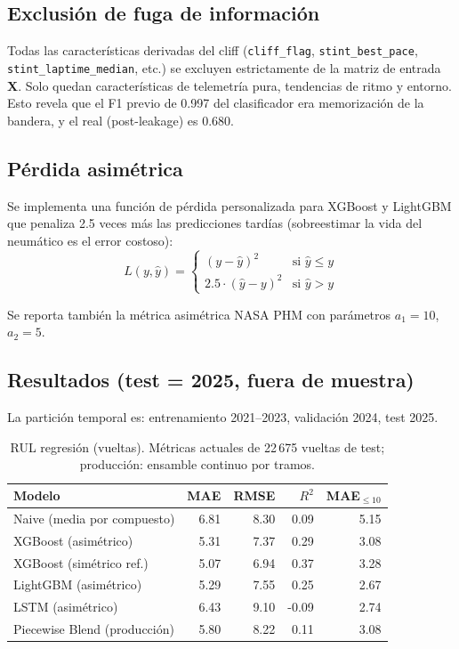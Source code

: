 \documentclass[conference]{IEEEtran}
\begin{document}
\subsection{Exclusión de fuga de información}

Todas las características derivadas del cliff (\texttt{cliff\_flag},
\texttt{stint\_best\_pace}, \texttt{stint\_laptime\_median}, etc.) se
excluyen estrictamente de la matriz de entrada \textbf{X}. Solo quedan
características de telemetría pura, tendencias de ritmo y entorno. Esto
revela que el F1 previo de 0.997 del clasificador era memorización de la
bandera, y el real (post-leakage) es 0.680.

\subsection{Pérdida asimétrica}

Se implementa una función de pérdida personalizada para XGBoost y LightGBM
que penaliza 2.5 veces más las predicciones tardías (sobreestimar la vida
del neumático es el error costoso):
\begin{equation}
  L(y, \hat{y}) = \begin{cases}
    (y - \hat{y})^2 & \text{si } \hat{y} \le y \\
    2.5 \cdot (\hat{y} - y)^2 & \text{si } \hat{y} > y
  \end{cases}
\end{equation}

Se reporta también la métrica asimétrica NASA PHM con parámetros
$a_1 = 10$, $a_2 = 5$.

\subsection{Resultados (test = 2025, fuera de muestra)}

La partición temporal es: entrenamiento 2021–2023, validación 2024,
test 2025.

\begin{table}[!htbp]
\centering
\caption{RUL regresión (vueltas). Métricas actuales de 22\,675 vueltas de test; producción: ensamble continuo por tramos.}
\label{tab:rul}
\begin{tabular}{lrrrr}
\toprule
\textbf{Modelo} & \textbf{MAE} & \textbf{RMSE} & $R^2$ & \textbf{MAE$_{\le 10}$} \\
\midrule
Naive (media por compuesto) & 6.81 & 8.30 & 0.09 & 5.15 \\
XGBoost (asimétrico) & 5.31 & 7.37 & 0.29 & 3.08 \\
XGBoost (simétrico ref.) & 5.07 & 6.94 & 0.37 & 3.28 \\
LightGBM (asimétrico) & 5.29 & 7.55 & 0.25 & 2.67 \\
LSTM (asimétrico) & 6.43 & 9.10 & -0.09 & 2.74 \\
Piecewise Blend (producción) & 5.80 & 8.22 & 0.11 & 3.08 \\
\bottomrule
\end{tabular}
\end{table}
\end{document}
